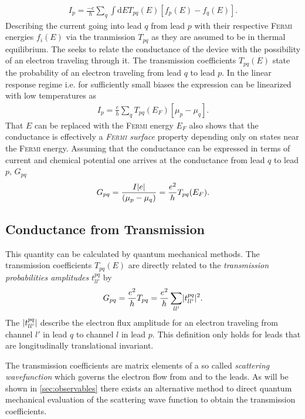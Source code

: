 \begin{align}
I_p=\frac{-e}{h} \sum_q \int \text{d}E T_{pq}(E) [f_p(E) - f_q(E)].
\label{eqn:current}
\end{align}
Describing the current going into lead $q$ from lead $p$ with their respective \textsc{Fermi} energies $f_i(E)$ via the tranmission $T_{pq}$ as they are assumed to be in thermal equilibrium. 
The \lanbform{} seeks to relate the conductance of the device with the possibility of an electron traveling through it. The transmission coefficients $T_{pq}(E)$ state the probability of an electron traveling from lead $q$ to lead $p$. 
In the linear response regime i.e. for sufficiently small biases the expression can be linearized with low temperatures as
\begin{align}
I_p=\frac{e}{h} \sum_q T_{pq}(E_F) [\mu_p - \mu_q].
\label{eqn:currentlin}
\end{align}
That $E$ can be replaced with the \textsc{Fermi} energy $E_F$ also shows that the conductance is effectively a \emph{\textsc{Fermi} surface} property depending only on states near the \textsc{Fermi} energy.
Assuming that the conductance can be expressed in terms of current and chemical potential one arrives at the conductance from lead $q$ to lead $p$, $G_{pq}$
\begin{align}
G_{pq}=\frac{I\lvert e\rvert}{(\mu_p - \mu_q)}=\frac{e^2}{h} T_{pq}(E_F).
\label{eqn:conductance}
\end{align}
\subsection{Conductance from Transmission}\label{sec:conductancefromtransmission}
This quantity can be calculated by quantum mechanical methods. The transmission coefficients $T_{pq}(E)$ are directly related to the \emph{transmission probabilities amplitudes} $t^{pq}_{ll'}$ by
\begin{align}
G_{pq}=\frac{e^2}{h} T_{pq} =\frac{e^2}{h} \sum_{ll'} \lvert t^{pq}_{ll'}\rvert^2.
\label{eqn:transcoeff}
\end{align}
The $\lvert t^{pq}_{ll'}\rvert$ describe the electron flux amplitude for an electron traveling from channel $l'$ in lead $q$ to channel $l$ in lead $p$. This definition only holds for leads that are longitudinally translational invariant.\par
The transmission coefficients are matrix elements of a so called \emph{scattering wavefunction} which governs the electron flow from and to the leads\cite{Datta1997}. As will be shown in \cref{sec:observables} there exists an alternative method to direct quantum mechanical evaluation of the scattering wave function to obtain the transmission coefficients.
